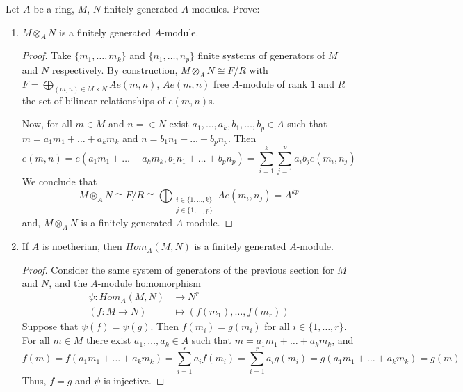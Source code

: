 \begin{problem}
    Let $A$ be a ring, $M$, $N$ finitely generated $A$-modules.
    Prove:
    \begin{enumerate}[label=(\theproblem.\arabic*),ref=\theproblem.\arabic*]
        \item $M \otimes_A N$ is a finitely generated $A$-module.
            \begin{sol}
                \begin{proof}
                    Take $\{m_1, \dots, m_k\}$ and $\{n_1, \dots, n_p\}$ finite systems of generators of $M$ and $N$ respectively.
                    By construction, $M \otimes_A N \cong F/R$ with $F = \bigoplus_{(m,n) \in M \times N} A e(m,n)$, $A e(m,n)$ free
                    $A$-module of rank $1$ and $R$ the set of bilinear relationships of $e(m,n)$s.

                    Now, for all $m \in M$ and $n = \in N$ exist $a_1, \dots, a_k, b_1, \dots, b_p \in A$ such that $m = a_1 m_1 + \dots + a_k m_k$ and $n = b_1 n_1 + \dots + b_p n_p$.
                    Then
                    \[
                       e(m,n) = e(a_1 m_1 + \dots + a_k m_k, b_1 n_1 + \dots + b_p n_p) = \sum_{i=1}^{k}\sum_{j=1}^{p} a_i b_j e(m_i, n_j)
                    \]
                    We conclude that
                    \[
                        M \otimes_A N \cong F/R \cong \bigoplus_{\substack{i \in \{1,\dots,k\} \\ j \in \{1,\dots,p\}}} A e(m_i,n_j) = A^{kp}
                    \]
                    and, $M \otimes_A N$ is a finitely generated $A$-module.
                \end{proof}
            \end{sol}
        \item If $A$ is noetherian, then $Hom_A(M,N)$ is a finitely generated $A$-module.
            \begin{sol}
                \begin{proof}
                    Consider the same system of generators of the previous section for $M$ and $N$, and the $A$-module homomorphism
                    \begin{align*}
                        \psi\colon Hom_A(M,N) &\to N^r \\
                        (f: M \rightarrow N) &\mapsto (f(m_1), \dots, f(m_r))
                    \end{align*}
                    Suppose that $\psi(f) = \psi(g)$.
                    Then $f(m_i) = g(m_i)$ for all $i \in \{1, \dots, r\}$.
                    For all $m \in M$ there exist $a_1, \dots, a_k \in A$ such that $m = a_1 m_1 + \dots + a_k m_k$, and
                    \[
                        f(m) = f(a_1 m_1 + \dots + a_k m_k) = \sum_{i=1}^{r} a_i f(m_i) = \sum_{i=1}^{r} a_i g(m_i) = g(a_1 m_1 + \dots + a_k m_k) = g(m)
                    \]
                    Thus, $f = g$ and $\psi$ is injective.


\end{proof}
\end{sol}
\end{enumerate}
\end{problem}
